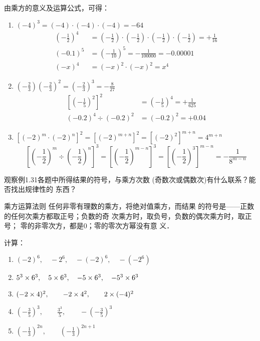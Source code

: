 \begin{solution}
	由乘方的意义及运算公式，可得：
	\begin{enumerate}
		\item $(-4)^3=(-4)\cdot (-4)\cdot (-4)=-64$
		\[\begin{split}
		\left(-\frac{1}{2}\right)^4&=\left(-\frac{1}{2}\right)\cdot\left(-\frac{1}{2}\right)\cdot\left(-\frac{1}{2}\right)\cdot\left(-\frac{1}{2}\right)=+\frac{1}{16}\\
		(-0.1)^5&=\left(-\frac{1}{10}\right)^5=-\frac{1}{100000}=-0.00001\\
		(-x)^4&=(-x)^2\cdot (-x)^2=x^4
		\end{split}\]
		\item $\left(-\frac{2}{3}\right)\left(-\frac{2}{3}\right)^2=\left(-\frac{2}{3}\right)^3=-\frac{8}{27}$
		\[\begin{split}
		\left[\left(-\frac{1}{5}\right)^2\right]^2&=\left(-\frac{1}{5}\right)^4=+\frac{1}{625}\\
		(-0.2)^4\div (-0.2)^2&=(-0.2)^2=+0.04
		\end{split}\]
		\item $\left[(-2)^m\cdot (-2)^n\right]^2=[(-2)^{m+n}]^2=[(-2)^2]^{m+n}=4^{m+n}$
		\[\left[\left(-\frac{1}{2}\right)^m\div \left(-\frac{1}{2}\right)^n\right]^3=\left[\left(-\frac{1}{2}\right)^{m-n}\right]^3=\left[\left(-\frac{1}{2}\right)^3\right]^{m-n}=-\frac{1}{8^{m-n}}\]
	\end{enumerate}
\end{solution}

观察例1.31各题中所得结果的符号，与乘方次数
(奇数次或偶数次)有什么联系？能否找出规律性的
东西？

\begin{blk}{乘方运算法则}
	任何非零有理数的乘方，将绝对值乘方，而结果
	的符号是——正数的任何次乘方都取正号；负数的奇
	次乘方时，取负号，负数的偶次乘方时，取正号；
	零的非零次方，都是0；零的零次方幂没有意
	义．
\end{blk}


\begin{example}
	计算：
	\begin{enumerate}
		\item $(-2)^6,\quad -2^6,\quad -(-2)^6,\quad -(-2^6) $
		\item $5^3\times 6^3,\quad 5\times 6^3,\quad -5\times 6^3,\quad -5^3\times 6^3$
		\item $(-2\times 4)^2,\qquad -2\times 4^2,\qquad 2\times (-4)^2$
		\item $\left(-\frac{3}{5}\right)^3,\qquad \frac{3^3}{5},\qquad -\left(-\frac{3}{5}\right)^3$
		\item $\left(-\frac{1}{3}\right)^{2n},\qquad \left(-\frac{1}{3}\right)^{2n+1}$
	\end{enumerate}
\end{example}

